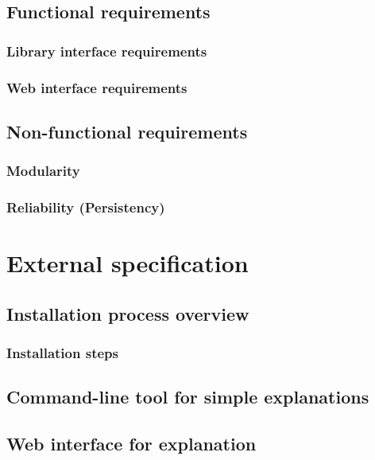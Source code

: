 \documentclass[
    bindingoffset=5mm,  %
    footnoteindent=3mm, %
    hyphenation=true    %
]{src/wut-thesis}
\begin{document}
\subsection{Functional requirements}
\subsubsection{Library interface requirements}
\subsubsection{Web interface requirements}

\subsection{Non-functional requirements}
\subsubsection{Modularity}
\subsubsection{Reliability (Persistency)}

%
%
\clearpage %
\section{External specification} \label{ch:externalSpec}

\subsection{Installation process overview}
\subsubsection{Installation steps}

\subsection{Command-line tool for simple explanations}

\subsection{Web interface for explanation}
\end{document}
